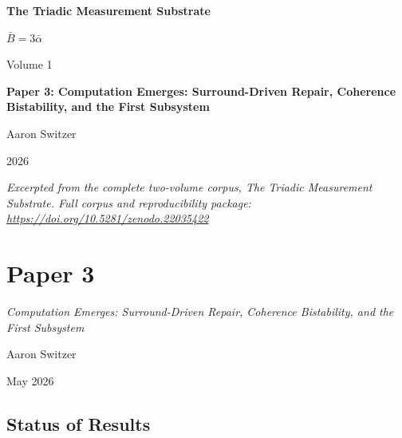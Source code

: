 \documentclass[11pt,oneside]{report}
\theoremstyle{definition}
\theoremstyle{remark}
\begin{document}
\thispagestyle{empty}
\begin{titlepage}
\centering
\vspace*{2cm}
{\sffamily\bfseries\Large The Triadic Measurement Substrate\par}
\vspace{0.6cm}
{\large $\bar{B} = 3\bar{\alpha}$\par}
\vspace{1cm}
{\sffamily\large Volume 1\par}
\vspace{1.4cm}
{\Large \bfseries Paper 3: Computation Emerges: Surround-Driven Repair, Coherence Bistability, and the First Subsystem\par}
\vfill
{\large Aaron Switzer\par}
\vspace{0.4cm}
{\large 2026\par}
\vspace{1.2cm}
{\small\itshape Excerpted from the complete two-volume corpus, \emph{The Triadic Measurement Substrate}. Full corpus and reproducibility package: \url{https://doi.org/10.5281/zenodo.22035422}\par}
\end{titlepage}
\cleardoublepage
{}

\chapter*{Paper 3}
\begingroup\centering
{\large\itshape Computation Emerges: Surround-Driven Repair, Coherence Bistability, and the First Subsystem\par}\vspace{0.8em}
{\normalsize Aaron Switzer\par}
{\small May 2026\par}
\endgroup\vspace{1.0em}

\par\vspace{0.6em}

\section*{Status of Results}
\end{document}
